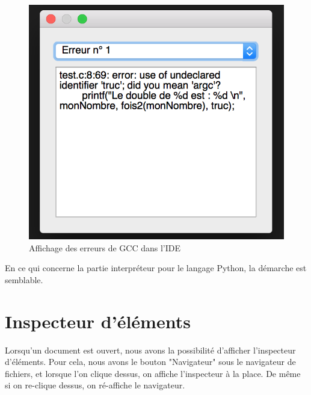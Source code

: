 \documentclass[a4paper,12pt]{article}
\begin{document}
			\begin{figure}[h!]
				\begin{center}
					\includegraphics[scale=0.6]{images/fenErreurEx}
					\caption{Affichage des erreurs de GCC dans l'IDE}
				\end{center}
			\end{figure}

		En ce qui concerne la partie interpréteur pour le langage Python, la démarche est semblable. 


\section{Inspecteur d'éléments}

	Lorsqu'un document est ouvert, nous avons la possibilité d'afficher l'inspecteur d'éléments. Pour cela, nous avons le bouton "Navigateur" sous le navigateur de fichiers, et lorsque l'on clique dessus, on affiche l'inspecteur à la place. De même si on re-clique dessus, on ré-affiche le navigateur.
	
\end{document}
